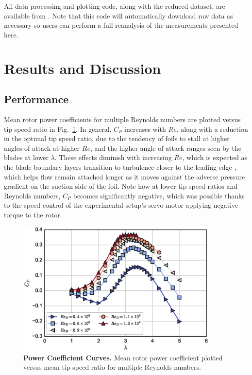 \documentclass[10pt,letterpaper]{article}
\begin{document}
All data processing and plotting code, along with the reduced dataset, are
available from \cite{Bachant2015-RM2-data}. Note that this code will
automatically download raw data as necessary so users can perform a full
reanalysis of the measurements presented here.


\section*{Results and Discussion}

\subsection*{Performance}

Mean rotor power coefficients for multiple Reynolds numbers are plotted versus
tip speed ratio in Fig.~\ref{fig:cp-curves}. In general, $C_P$ increases with
$Re$, along with a reduction in the optimal tip speed ratio, due to the tendency
of foils to stall at higher angles of attack at higher $Re$, and the higher
angle of attack ranges seen by the blades at lower $\lambda$. These effects
diminish with increasing $Re$, which is expected as the blade boundary layers
transition to turbulence closer to the leading edge \cite{Lissaman1983,
    McMasters1980, Bachant2016-RVAT-Re-dep}, which helps flow remain attached longer
as it moves against the adverse pressure gradient on the suction side of the
foil. Note how at lower tip speed ratios and Reynolds numbers, $C_P$ becomes
significantly negative, which was possible thanks to the speed control of the
experimental setup's servo motor applying negative torque to the rotor.

\begin{figure}
    \includegraphics[width=0.9\textwidth]{figures/cp_curves.eps}

    \caption{{\bf Power Coefficient Curves.} Mean rotor power coefficient
    plotted versus mean tip speed ratio for multiple Reynolds numbers.}

    \label{fig:cp-curves}
\end{figure}
\end{document}
